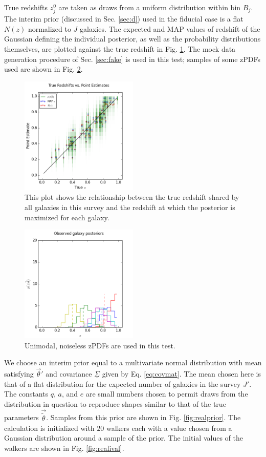 \documentclass[preprint]{aastex}
\newcommand{\textul}{\underline}
\begin{document}
True redshifts $z^{0}_{j}$ are taken as draws from a uniform distribution within bin $B_{j}$.  The interim prior (discussed in Sec. \ref{sec:d}) used in the fiducial case is a flat $N(z)$ normalized to $J$ galaxies.  The expected and MAP values of redshift of the Gaussian defining the individual posterior, as well as the probability distributions themselves, are plotted against the true redshift in Fig. \ref{fig:realcat}.  The mock data generation procedure of Sec. \ref{sec:fake} is used in this test; samples of some zPDFs used are shown in Fig. \ref{fig:nullpzs}.

\begin{figure}
\includegraphics[width=0.5\textwidth]{null/truevmap.png}
\caption{This plot shows the relationship between the true redshift shared by all galaxies in this survey and the redshift at which the posterior is maximized for each galaxy.}
\label{fig:realcat}
\end{figure}

\begin{figure}
\includegraphics[width=0.5\textwidth]{null/samplepzs.png}
\caption{Unimodal, noiseless zPDFs are used in this test.}
\label{fig:nullpzs}
\end{figure}

We choose an interim prior equal to a multivariate normal distribution with mean satisfying $\vec{\theta}'$ and covariance $\textul{\Sigma}$ given by Eq. \ref{eq:covmat}.  The mean chosen here is that of a flat distribution for the expected number of galaxies in the survey $J'$.  The constants $q$, $a$, and $e$ are small numbers chosen to permit draws from the distribution in question to reproduce shapes similar to that of the true parameters $\vec{\tilde{\theta}}$.  Samples from this prior are shown in Fig. \ref{fig:realprior}.  The calculation is initialized with $20$ walkers each with a value chosen from a Gaussian distribution around a sample of the prior.  The initial values of the walkers are shown in Fig. \ref{fig:realival}.
\end{document}
